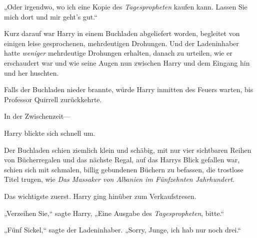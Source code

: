 „Oder irgendwo, wo ich eine Kopie des \emph{Tagespropheten} kaufen kann. Lassen Sie mich dort und mir geht's gut.“

Kurz darauf war Harry in einem Buchladen abgeliefert worden, begleitet von einigen leise gesprochenen, mehrdeutigen Drohungen. Und der Ladeninhaber hatte \emph{weniger} mehrdeutige Drohungen erhalten, danach zu urteilen, wie er erschaudert war und wie seine Augen nun zwischen Harry und dem Eingang hin und her huschten.

Falls der Buchladen nieder brannte, würde Harry inmitten des Feuers warten, bis Professor Quirrell zurückkehrte.

In der Zwischenzeit—

Harry blickte sich schnell um.

Der Buchladen schien ziemlich klein und schäbig, mit nur vier sichtbaren Reihen von Bücherregalen und das nächste Regal, auf das Harrys Blick gefallen war, schien sich mit schmalen, billig gebundenen Büchern zu befassen, die trostlose Titel trugen, wie \emph{Das Massaker von Albanien im Fünfzehnten Jahrhundert}.%

Das wichtigste zuerst. Harry ging hinüber zum Verkaufstresen.

„Verzeihen Sie,“ sagte Harry, „Eine Ausgabe des \emph{Tagespropheten}, bitte.“

„Fünf Sickel,“ sagte der Ladeninhaber. „Sorry, Junge, ich hab nur noch drei.“

